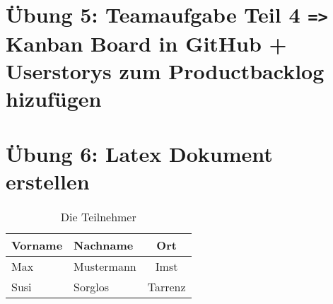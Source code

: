 \documentclass[a4paper,12pt]{report}
\begin{document}
    \chapter{Übung 5: Teamaufgabe Teil 4 \texttt{=>} Kanban Board in GitHub + Userstorys zum Productbacklog hizufügen}
    \chapter{Übung 6: Latex Dokument erstellen}
    

    
    \begin{table}[h]
        \begin{center}
            \begin{tabular}{ l  l | c }
             Vorname & Nachname & Ort \\
             \hline
             Max & Mustermann & Imst \\  
             Susi & Sorglos & Tarrenz    
            \end{tabular}
        \end{center}
        \caption{Die Teilnehmer}
        \label{tab:teilnehmer}
    \end{table}
 
\end{document}
